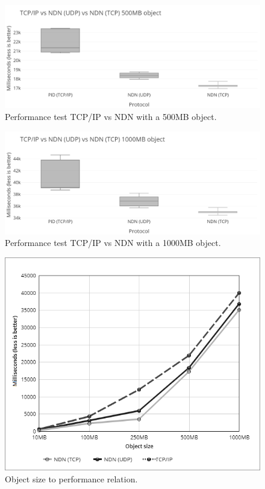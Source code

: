 \begin{figure}[H]
\centering
\includegraphics[scale=0.43]{Images/ndn_tcpip_500_grey.png}
\caption{Performance test TCP/IP vs NDN with a 500MB object.}
\label{fig:perftest-4}
\end{figure}

\begin{figure}[H]
\centering
\includegraphics[scale=0.43]{Images/ndn_tcpip_1000_grey.png}
\caption{Performance test TCP/IP vs NDN with a 1000MB object.}
\label{fig:perftest-5}
\end{figure}

\begin{figure}[H]
\centering
\includegraphics[scale=0.7]{Images/linechart5.png}
\caption{Object size to performance relation.}
\label{fig:perftest-6}
\end{figure}

